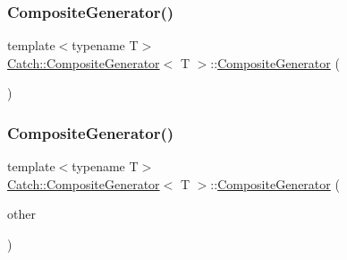 \subsubsection{\texorpdfstring{Composite\+Generator()}{CompositeGenerator()}\hspace{0.1cm}{\footnotesize\ttfamily [1/2]}}
{\footnotesize\ttfamily template$<$typename T$>$ \\
\hyperlink{class_catch_1_1_composite_generator}{Catch\+::\+Composite\+Generator}$<$ T $>$\+::\hyperlink{class_catch_1_1_composite_generator}{Composite\+Generator} (\begin{DoxyParamCaption}{ }\end{DoxyParamCaption})\hspace{0.3cm}{\ttfamily [inline]}}

\mbox{\label{class_catch_1_1_composite_generator_a21a7070a00e4a6fe021294c356692692}} 
\subsubsection{\texorpdfstring{Composite\+Generator()}{CompositeGenerator()}\hspace{0.1cm}{\footnotesize\ttfamily [2/2]}}
{\footnotesize\ttfamily template$<$typename T$>$ \\
\hyperlink{class_catch_1_1_composite_generator}{Catch\+::\+Composite\+Generator}$<$ T $>$\+::\hyperlink{class_catch_1_1_composite_generator}{Composite\+Generator} (\begin{DoxyParamCaption}\item[{\hyperlink{class_catch_1_1_composite_generator}{Composite\+Generator}$<$ T $>$ \&}]{other }\end{DoxyParamCaption})\hspace{0.3cm}{\ttfamily [inline]}}

\mbox{\label{class_catch_1_1_composite_generator_a5766205abd7004c508c20ddbb5e5555e}} 
